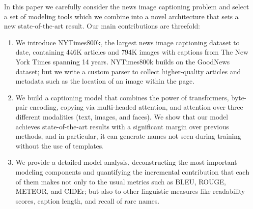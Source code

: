 



In this paper we carefully consider the news image captioning problem and
select a set of modeling tools which we combine into a novel architecture that
sets a new state-of-the-art result. Our main contributions are threefold:


\begin{enumerate}
   \item We introduce NYTimes800k, the largest news image captioning dataset to
   date, containing 446K articles and 794K images with captions from The New
   York Times spanning 14 years. NYTimes800k builds on the GoodNews dataset;
   but we write a custom parser to collect higher-quality articles and metadata
   such as the location of an image within the page.

   \item We build a captioning model that combines the power of transformers,
   byte-pair encoding, copying via multi-headed attention, and attention over
   three different modalities (text, images, and faces). We show that our model
   achieves state-of-the-art results with a significant margin over previous
   methods, and in particular, it can generate names not seen during training
   without the use of templates.

   \item We provide a detailed model analysis, deconstructing the most
   important modeling components and quantifying the incremental contribution
   that each of them makes not only to the usual metrics such as BLEU, ROUGE,
   METEOR, and CIDEr; but also to other linguistic measures like readability
   scores, caption length, and recall of rare names.
\end{enumerate}
